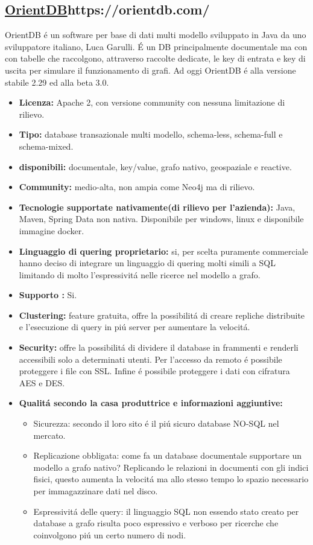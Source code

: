 \subsection{\url{OrientDB}{https://orientdb.com/}}
OrientDB \'e un software per base di dati multi modello sviluppato in Java da uno sviluppatore italiano, Luca Garulli. \'E un DB principalmente documentale ma con con tabelle che raccolgono, attraverso raccolte dedicate, le key di entrata e key di uscita per simulare il funzionamento di grafi. Ad oggi OrientDB \'e alla versione stabile 2.29 ed alla beta 3.0.
\begin{itemize}
\item \textbf{Licenza:} Apache 2, con versione community con nessuna limitazione di rilievo.
\item \textbf{Tipo:} database transazionale multi modello, schema-less, schema-full e schema-mixed.
\item \textbf{ disponibili:} documentale, key/value, grafo nativo, geospaziale e reactive.
\item \textbf{Community:} medio-alta, non ampia come Neo4j ma di rilievo.
\item \textbf{Tecnologie supportate nativamente(di rilievo per l'azienda):} Java, Maven, Spring Data non nativa. Disponibile per windows, linux e disponibile immagine docker.
\item\textbf{Linguaggio di quering proprietario:} si, per scelta puramente commerciale hanno deciso di integrare un linguaggio di quering molti simili a SQL limitando di molto l'espressivit\'a nelle ricerce nel modello a grafo.
\item\textbf{Supporto :} Si.

\item\textbf{Clustering:} feature gratuita, offre la possibilit\'a di creare repliche distribuite e l'esecuzione di query in pi\'u server per aumentare la velocit\'a.
\item\textbf{Security:} offre la possibilit\'a di dividere il database in frammenti e renderli accessibili solo a determinati utenti. Per l'accesso da remoto \'e possibile proteggere i file con SSL. Infine \'e possibile proteggere i dati con cifratura AES e DES.	
\item\textbf{Qualit\'a secondo la casa produttrice e informazioni aggiuntive:} 
\begin{itemize}
\item{Sicurezza:} secondo il loro sito \'e il pi\'u sicuro database NO-SQL nel mercato.
\item{Replicazione obbligata:} come fa un database documentale supportare un modello a grafo nativo? Replicando le relazioni in documenti con gli indici fisici, questo aumenta la velocit\'a ma allo stesso tempo lo spazio necessario per immagazzinare dati nel disco.
\item{Espressivit\'a delle query:} il linguaggio SQL non essendo stato creato per database a grafo risulta poco espressivo e verboso per ricerche che coinvolgono pi\'u un certo numero di nodi.
\end{itemize}
\end{itemize}

